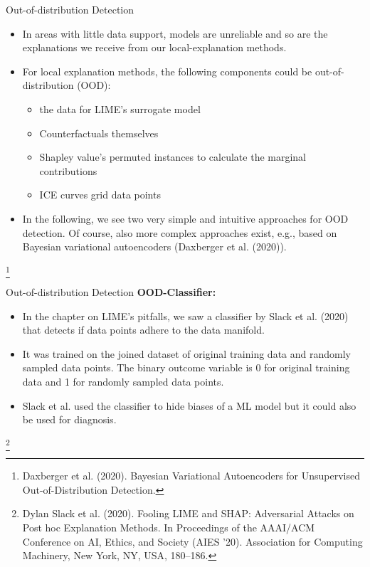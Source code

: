 \documentclass[11pt,compress,t,notes=noshow, aspectratio=169, xcolor=table]{beamer}
\begin{document}
\begin{vbframe}{Out-of-distribution Detection}
	\begin{itemize}
		\item In areas with little data support, models are unreliable and so are the explanations we receive from our local-explanation methods.
		\item For local explanation methods, the following components could be out-of-distribution (OOD): 
		\begin{itemize}
			\item the data for LIME's surrogate model
			\item Counterfactuals themselves
			\item Shapley value's permuted instances to calculate the marginal contributions 
			\item ICE curves grid data points 
		\end{itemize}
		\item In the following, we see two very simple and intuitive approaches for OOD detection. Of course, also more complex approaches exist, e.g., based on Bayesian variational autoencoders (Daxberger et al. (2020)).
	\end{itemize}
\footnote[frame]{Daxberger et al. (2020). Bayesian Variational Autoencoders for Unsupervised Out-of-Distribution Detection.}
\end{vbframe}


\begin{vbframe}{Out-of-distribution Detection}
	\textbf{OOD-Classifier:} 
	\begin{itemize}
		\item In the chapter on LIME's pitfalls, we saw a classifier by Slack et al. (2020) that detects if data points adhere to the data manifold. 
		\item It was trained on the joined dataset of original training data and randomly sampled data points. 
		The binary outcome variable is 0 for original training data and 1 for randomly sampled data points. 
		\item Slack et al. used the classifier to hide biases of a ML model but it could also be used for diagnosis.  
	\end{itemize}
	\footnote[frame]{Dylan Slack et al. (2020). Fooling LIME and SHAP: Adversarial Attacks on Post hoc Explanation Methods. In Proceedings of the AAAI/ACM Conference on AI, Ethics, and Society (AIES '20). Association for Computing Machinery, New York, NY, USA, 180–186.}
\end{vbframe}
\end{document}

